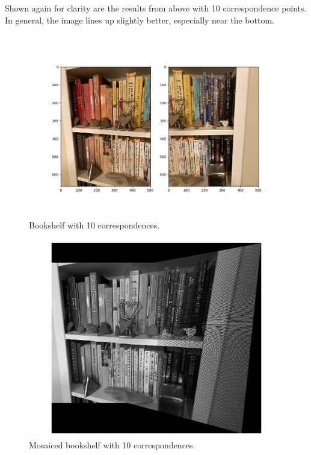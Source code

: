 \documentclass[]{article}
\begin{document}
	\newpage
	
	Shown again for clarity are the results from above with 10 correspondence points. In general, the image lines up slightly better, especially near the bottom.
	\begin{figure}[H]
		\centering
		\includegraphics[width=6.5in]{test_images/shelf_10_correspondences.png}
		\caption{Bookshelf with 10 correspondences. }
	\end{figure}
	
	\begin{figure}[H]
		\centering
		\includegraphics[width=6.5in]{test_images/shelf_10_floor.png}
		\caption{Mosaiced bookshelf with 10 correspondences. }
	\end{figure}
\end{document}

